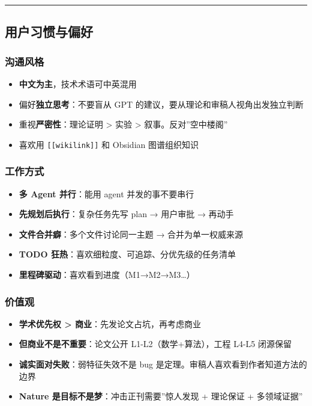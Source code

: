 \documentclass[
  12pt,
]{ctexart}
\providecommand{\tightlist}{%
  \setlength{\itemsep}{0pt}\setlength{\parskip}{0pt}}
\begin{document}
\begin{center}\rule{0.5\linewidth}{0.5pt}\end{center}

\subsection{用户习惯与偏好}\label{ux7528ux6237ux4e60ux60efux4e0eux504fux597d}

\subsubsection{沟通风格}\label{ux6c9fux901aux98ceux683c}

\begin{itemize}
\tightlist
\item
  \textbf{中文为主}，技术术语可中英混用
\item
  偏好\textbf{独立思考}：不要盲从 GPT
  的建议，要从理论和审稿人视角出发独立判断
\item
  重视\textbf{严密性}：理论证明 \textgreater{} 实验 \textgreater{}
  叙事。反对''空中楼阁''
\item
  喜欢用 \texttt{{[}{[}wikilink{]}{]}} 和 Obsidian 图谱组织知识
\end{itemize}

\subsubsection{工作方式}\label{ux5de5ux4f5cux65b9ux5f0f}

\begin{itemize}
\tightlist
\item
  \textbf{多 Agent 并行}：能用 agent 并发的事不要串行
\item
  \textbf{先规划后执行}：复杂任务先写 plan → 用户审批 → 再动手
\item
  \textbf{文件合并癖}：多个文件讨论同一主题 → 合并为单一权威来源
\item
  \textbf{TODO 狂热}：喜欢细粒度、可追踪、分优先级的任务清单
\item
  \textbf{里程碑驱动}：喜欢看到进度（M1→M2→M3\ldots）
\end{itemize}

\subsubsection{价值观}\label{ux4ef7ux503cux89c2}

\begin{itemize}
\tightlist
\item
  \textbf{学术优先权 \textgreater{} 商业}：先发论文占坑，再考虑商业
\item
  \textbf{但商业不是不重要}：论文公开 L1-L2（数学+算法），工程 L4-L5
  闭源保留
\item
  \textbf{诚实面对失败}：弱特征失效不是 bug
  是定理。审稿人喜欢看到作者知道方法的边界
\item
  \textbf{Nature 是目标不是梦}：冲击正刊需要''惊人发现 + 理论保证 +
  多领域证据''
\end{itemize}
\end{document}

